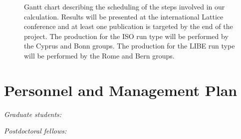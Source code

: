 \documentclass[a4paper,12pt]{article}
\newif\ifshowinstructions
\newcommand{\instructions}[1]{\ifshowinstructions {\fontsize{10}{11}\selectfont #1} \fi}
\begin{document}
\begin{figure}[htb]
\begin{ganttchart}



  \end{ganttchart}
  \caption{Gantt chart describing the scheduling of the steps involved
    in our calculation. Results will be presented at the international Lattice conference and at least one publication is targeted by the end of the project. The production for the ISO run type will be performed by the Cyprus and Bonn groups. The production for the LIBE run type will be performed by the Rome and Bern groups.}
  \label{fig:gantt}
  \vspace*{-0.6cm}
\end{figure}

\section{Personnel and Management Plan \instructions{(0.5 page)}}


\instructions{\it

  What personnel are already in place and what are their roles on the project? 
  If applicable, describe (i) personnel that will be hired for the project in the future and their responsibilities and (ii) potential personnel turnover that may occur during the project and a strategy for replacing them.
  The EuroHPC Regular Access calls welcome proposals from individual PIs or teams of collaborators.
  Outline the focus of each individual or subgroup and their interrelationships.

  {\color{orange}\textbf{It is mandatory to include all team members on the online form.}}

}

{\it Graduate students:} 

{\it Postdoctoral fellows:} 
\end{document}
